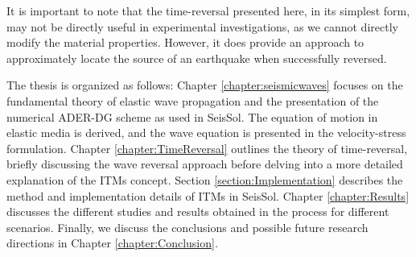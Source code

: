 It is important to note that the time-reversal presented here, in its simplest form, may not be directly useful in experimental 
investigations, as we cannot directly modify the material properties. However, it does provide an approach to approximately 
locate the source of an earthquake when successfully reversed.

The thesis is organized as follows: Chapter \ref{chapter:seismicwaves} focuses on the fundamental theory of elastic wave propagation and the presentation
of the numerical \ac{ADER}-\ac{DG} scheme as used in SeisSol. The equation of motion in elastic media is derived, and the wave equation is presented
in the velocity-stress formulation. Chapter \ref{chapter:TimeReversal} outlines the theory of time-reversal, briefly discussing the wave reversal approach before
delving into a more detailed explanation of the \ac{ITM}s concept. Section \ref{section:Implementation} describes the method and implementation details of \ac{ITM}s
in SeisSol. Chapter \ref{chapter:Results} discusses the different studies and results obtained in the process for different scenarios. Finally, we discuss the conclusions
and possible future research directions in Chapter \ref{chapter:Conclusion}. 

